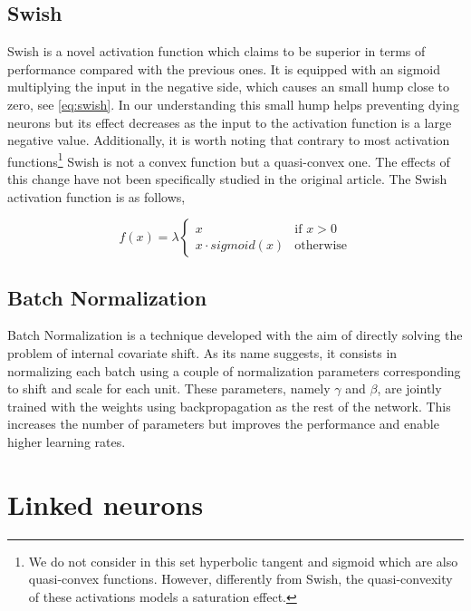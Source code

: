 \documentclass[10pt,twocolumn,letterpaper]{article}
\begin{document}
\subsection{Swish}

Swish\cite{swish}  is a novel activation function which claims to be superior in terms of performance compared with the previous ones. It is equipped with an sigmoid multiplying the input in the negative side, which causes an small hump close to zero, see \ref{eq:swish}. In our understanding this small hump helps preventing dying neurons but its effect decreases as the input to the activation function is a large negative value. Additionally, it is worth noting that contrary to most activation functions\footnote{We do not consider in this set hyperbolic tangent and sigmoid which are also quasi-convex functions. However, differently from Swish, the quasi-convexity of these activations models a saturation effect.} Swish is not a convex function but a quasi-convex one. The effects of this change have not been specifically studied in the original article. The Swish activation function is as follows,

\begin{equation}
f(x)=\lambda{\begin{cases}
    x&{\mbox{if }}x>0\\
    x \cdot sigmoid(x) &{\mbox{otherwise}}
    \end{cases}}
\label{eq:swish}
\end{equation}

\subsection{Batch Normalization}

Batch Normalization \cite{batchnorm} is a technique developed with the aim of directly solving the problem of internal covariate shift. As its name suggests, it consists in normalizing each batch using a couple of normalization parameters corresponding to shift and scale for each unit. These parameters, namely $\gamma$ and $\beta$, are jointly trained with the weights using backpropagation as the rest of the network. This increases the number of parameters but improves the performance and enable higher learning rates.

\section{Linked neurons}\label{sec:proposal}
\end{document}

